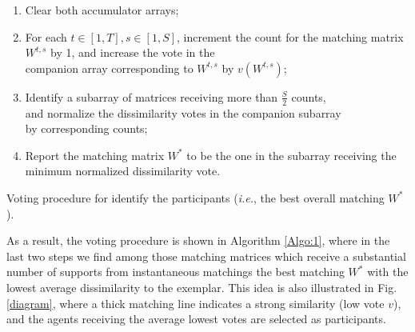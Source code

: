 \begin{algorithm}
\footnotesize{
\begin{enumerate}
\item Clear both accumulator arrays;
\item For each $t\in[1,T], s\in[1,S]$, increment the count for the matching matrix $W^{t,s}$ by 1, and increase the vote in the\\ 
companion array corresponding to $W^{t,s}$ by $v(W^{t,s})$;
\item Identify a subarray of matrices receiving more than $\frac{S}{2}$ counts, \\
and normalize the dissimilarity votes in the companion subarray 
\\by corresponding counts;
\item Report the matching matrix $W^{*}$ to be the one in the subarray receiving the minimum normalized dissimilarity vote.
\end{enumerate}
}
\caption{\small Voting procedure for identify the participants (\textit{i.e.}, the best overall matching $W^{*}$).}
\label{Algo:1}
\end{algorithm}
\vspace{-10pt}

 As a result, the voting procedure is shown in Algorithm \ref{Algo:1}, where in the last two steps we find among those matching matrices which receive a substantial number of supports from instantaneous matchings the best matching $W^{*}$ with the lowest average dissimilarity to the exemplar. This idea is also illustrated in Fig. \ref{diagram}, where a thick matching line indicates a strong similarity (low vote $v$), and the agents receiving the average lowest votes are selected as participants.


